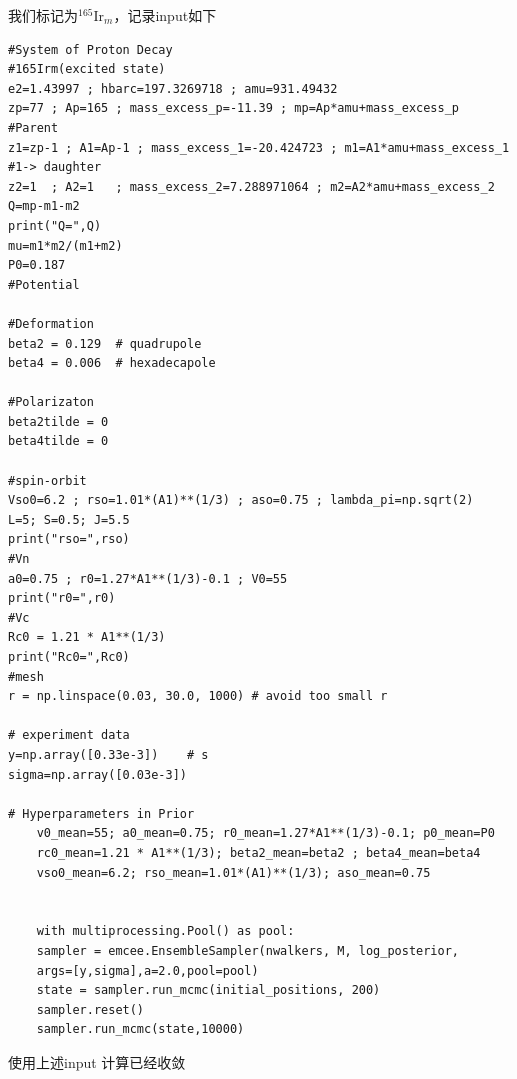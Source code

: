\documentclass[11pt,a4paper,UTF8,scheme=plain,fontset=fandol]{ctexbook}
\theoremstyle{definition}
\theoremstyle{plain}
\theoremstyle{remark}
\begin{document}
我们标记为$^{165}\mathrm{Ir}_m$，记录input如下
\begin{verbatim}
#System of Proton Decay
#165Irm(excited state)
e2=1.43997 ; hbarc=197.3269718 ; amu=931.49432
zp=77 ; Ap=165 ; mass_excess_p=-11.39 ; mp=Ap*amu+mass_excess_p        #Parent
z1=zp-1 ; A1=Ap-1 ; mass_excess_1=-20.424723 ; m1=A1*amu+mass_excess_1    #1-> daughter
z2=1  ; A2=1   ; mass_excess_2=7.288971064 ; m2=A2*amu+mass_excess_2
Q=mp-m1-m2
print("Q=",Q)
mu=m1*m2/(m1+m2)
P0=0.187
#Potential

#Deformation
beta2 = 0.129  # quadrupole
beta4 = 0.006  # hexadecapole 

#Polarizaton
beta2tilde = 0  
beta4tilde = 0

#spin-orbit
Vso0=6.2 ; rso=1.01*(A1)**(1/3) ; aso=0.75 ; lambda_pi=np.sqrt(2)
L=5; S=0.5; J=5.5
print("rso=",rso)
#Vn
a0=0.75 ; r0=1.27*A1**(1/3)-0.1 ; V0=55
print("r0=",r0)
#Vc
Rc0 = 1.21 * A1**(1/3)          
print("Rc0=",Rc0)
#mesh
r = np.linspace(0.03, 30.0, 1000) # avoid too small r

# experiment data
y=np.array([0.33e-3])    # s
sigma=np.array([0.03e-3])

# Hyperparameters in Prior
    v0_mean=55; a0_mean=0.75; r0_mean=1.27*A1**(1/3)-0.1; p0_mean=P0
    rc0_mean=1.21 * A1**(1/3); beta2_mean=beta2 ; beta4_mean=beta4
    vso0_mean=6.2; rso_mean=1.01*(A1)**(1/3); aso_mean=0.75


    with multiprocessing.Pool() as pool:
    sampler = emcee.EnsembleSampler(nwalkers, M, log_posterior, 
    args=[y,sigma],a=2.0,pool=pool)
    state = sampler.run_mcmc(initial_positions, 200)
    sampler.reset()
    sampler.run_mcmc(state,10000)
\end{verbatim}


使用上述input 计算已经收敛
\end{document}
